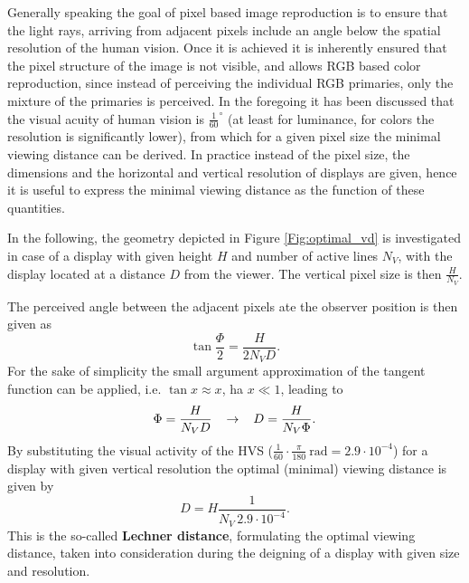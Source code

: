 Generally speaking the goal of pixel based image reproduction is to ensure that the light rays, arriving from adjacent pixels include an angle below the spatial resolution of the human vision.
Once it is achieved it is inherently ensured that the pixel structure of the image is not visible, and allows RGB based color reproduction, since instead of perceiving the individual RGB primaries, only the mixture of the primaries is perceived.
In the foregoing it has been discussed that the visual acuity of human vision is $\frac{1}{60}^{\circ}$ (at least for luminance, for colors the resolution is significantly lower), from which for a given pixel size the minimal viewing distance can be derived.
In practice instead of the pixel size, the dimensions and the horizontal and vertical resolution of displays are given, hence it is useful to express the minimal viewing distance as the function of these quantities.

In the following, the geometry depicted in Figure \ref{Fig:optimal_vd} is investigated in case of a display with given height $H$ and number of active lines $N_V$, with the display located at a distance $D$ from the viewer.
The vertical pixel size is then $\frac{H}{N_V}$.

The perceived angle between the adjacent pixels ate the observer position is then given as 
\begin{equation}
\tan \frac{\Phi}{2} = \frac{H}{2 N_V D}.
\end{equation}
For the sake of simplicity the small argument approximation of the tangent function can be applied, i.e. $\tan x \approx x$, ha $x \ll 1$, leading to
\begin{equation}
\Phi = \frac{H}{N_V D} \hspace{3mm} \rightarrow \hspace{3mm} D = \frac{H}{N_V \Phi}.
\end{equation}
By substituting the visual activity of the HVS ($\frac{1}{60}\cdot \frac{\pi}{180}~\mathrm{rad} = 2.9 \cdot 10^{-4}$) for a display with given vertical resolution the optimal (minimal) viewing distance is given by
\begin{equation}
D = H \frac{1}{N_V \,  2.9 \cdot 10^{-4}}.
\end{equation}
This is the so-called \textbf{Lechner distance}, formulating the optimal viewing distance, taken into consideration during the deigning of a display with given size and resolution.

